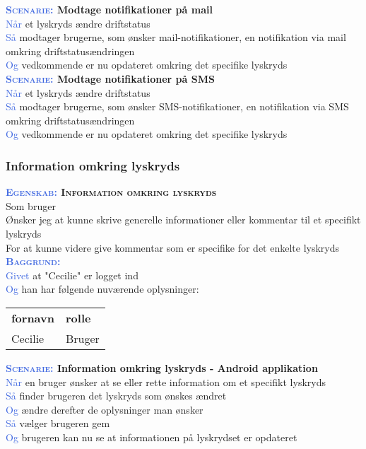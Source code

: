 \textbf{\textsc{\textcolor{RoyalBlue}{Scenarie:}} Modtage notifikationer på 
	mail}\\
\textcolor{RoyalBlue}{Når} et lyskryds ændre driftstatus\\
\textcolor{RoyalBlue}{Så} modtager brugerne, som ønsker 
mail-notifikationer, en notifikation via mail omkring driftstatusændringen\\
\textcolor{RoyalBlue}{Og} vedkommende er nu opdateret omkring det specifike lyskryds\\

\textbf{\textsc{\textcolor{RoyalBlue}{Scenarie:}} Modtage notifikationer på 
	SMS}\\
\textcolor{RoyalBlue}{Når} et lyskryds ændre driftstatus\\
\textcolor{RoyalBlue}{Så} modtager brugerne, som ønsker SMS-notifikationer, 
en notifikation via SMS omkring driftstatusændringen\\
\textcolor{RoyalBlue}{Og} vedkommende er nu opdateret omkring det specifike 
lyskryds\\

\subsubsection{Information omkring lyskryds}
\textbf{\textsc{\textcolor{RoyalBlue}{Egenskab:} Information omkring lyskryds}}\\
Som bruger\\
Ønsker jeg at kunne skrive generelle informationer eller kommentar til et specifikt lyskryds\\
For at kunne videre give kommentar som er specifike for det enkelte lyskryds\\

\textsc{\textcolor{RoyalBlue}{\textbf{Baggrund:}}}\\
\textcolor{RoyalBlue}{Givet} at "Cecilie" er logget ind\\
\textcolor{RoyalBlue}{Og} han har følgende nuværende oplysninger:\\
\begin{tabular}{| l | l |}
	\textbf{fornavn} & \textbf{rolle} \\
	Cecilie & Bruger\\
\end{tabular}
\newline \newline

\textbf{\textsc{\textcolor{RoyalBlue}{Scenarie:}} Information omkring lyskryds - Android applikation}\\
\textcolor{RoyalBlue}{Når} en bruger ønsker at se eller rette information om et specifikt lyskryds\\
\textcolor{RoyalBlue}{Så} finder brugeren det lyskryds som ønskes ændret\\
\textcolor{RoyalBlue}{Og} ændre derefter de oplysninger man ønsker\\
\textcolor{RoyalBlue}{Så} vælger brugeren gem\\
\textcolor{RoyalBlue}{Og} brugeren kan nu se at informationen på lyskrydset er opdateret\\

